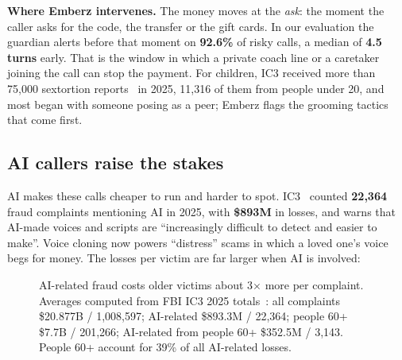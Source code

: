\documentclass[11pt]{article}
\newcommand{\num}[1]{\textbf{#1}}
\begin{document}
\noindent\textbf{Where Emberz intervenes.} The money moves at the \emph{ask}: the moment the caller asks for the code, the transfer or the gift cards. In our evaluation the guardian alerts before that moment on \num{92.6\%} of risky calls, a median of \num{4.5 turns} early. That is the window in which a private coach line or a caretaker joining the call can stop the payment. For children, IC3 received more than 75,000 sextortion reports~\cite{ic3} in 2025, 11,316 of them from people under 20, and most began with someone posing as a peer; Emberz flags the grooming tactics that come first.

\subsection*{AI callers raise the stakes}
AI makes these calls cheaper to run and harder to spot. IC3~\cite{ic3} counted \num{22,364} fraud complaints mentioning AI in 2025, with \num{\$893M} in losses, and warns that AI-made voices and scripts are ``increasingly difficult to detect and easier to make''. Voice cloning now powers ``distress'' scams in which a loved one's voice begs for money. The losses per victim are far larger when AI is involved:

\begin{figure}[H]\centering
{}
\caption{AI-related fraud costs older victims about 3$\times$ more per complaint. Averages computed from FBI IC3 2025 totals~\cite{ic3}: all complaints \$20.877B / 1,008,597; AI-related \$893.3M / 22,364; people 60+ \$7.7B / 201,266; AI-related from people 60+ \$352.5M / 3,143. People 60+ account for 39\% of all AI-related losses.}\label{fig:ai}
\end{figure}
\end{document}
